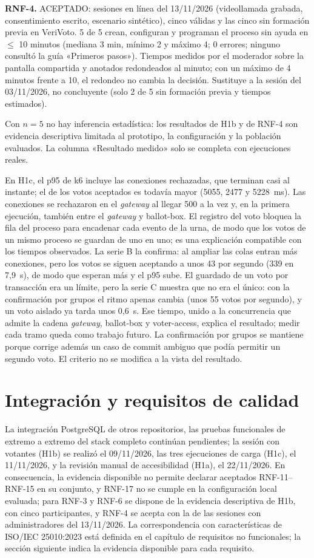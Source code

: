 \textbf{RNF-4.} ACEPTADO: sesiones en línea del 13/11/2026 (videollamada grabada, consentimiento escrito, escenario sintético), cinco válidas y las cinco sin formación previa en VeriVoto. 5 de 5 crean, configuran y programan el proceso sin ayuda en $\leq$ 10 minutos (mediana 3 min, mínimo 2 y máximo 4; 0 errores; ninguno consultó la guía «Primeros pasos»). Tiempos medidos por el moderador sobre la pantalla compartida y anotados redondeados al minuto; con un máximo de 4 minutos frente a 10, el redondeo no cambia la decisión. Sustituye a la sesión del 03/11/2026, no concluyente (solo 2 de 5 sin formación previa y tiempos estimados).

Con $n = 5$ no hay inferencia estadística: los resultados de H1b y de RNF-4
son evidencia descriptiva limitada al prototipo, la configuración y la
población evaluados. La columna «Resultado medido» solo se completa con
ejecuciones reales.

En H1c, el p95 de k6 incluye las conexiones rechazadas, que terminan casi al
instante; el de los votos aceptados es todavía mayor (5055, 2477 y 5228~ms).
Las conexiones se rechazaron en el \emph{gateway} al llegar 500 a la vez y, en
la primera ejecución, también entre el \emph{gateway} y ballot-box. El registro
del voto bloquea la fila del proceso para encadenar cada evento de la urna, de
modo que los votos de un mismo proceso se guardan de uno en uno; es una
explicación compatible con los tiempos observados. La serie B la confirma: al
ampliar las colas entran más conexiones, pero los votos se siguen aceptando a
unos 43 por segundo (339 en 7,9~s), de modo que esperan más y el p95 sube. El
guardado de un voto por transacción era un límite, pero la serie C muestra que
no era el único: con la confirmación por grupos el ritmo apenas cambia (unos 55
votos por segundo), y un voto aislado ya tarda unos 0,6~s. Ese tiempo, unido a la
concurrencia que admite la cadena \emph{gateway}, ballot-box y voter-access,
explica el resultado; medir cada tramo queda como trabajo futuro. La
confirmación por grupos se mantiene porque corrige además un caso de commit
ambiguo que podía permitir un segundo voto. El criterio no se modifica a la
vista del resultado.

\section{Integración y requisitos de calidad}
La integración PostgreSQL de otros repositorios, las pruebas funcionales de extremo a extremo del stack completo continúan pendientes; la sesión con votantes (H1b) se realizó el 09/11/2026,
las tres ejecuciones de carga (H1c), el 11/11/2026, y la revisión manual de accesibilidad (H1a), el 22/11/2026. En consecuencia, la
evidencia disponible no permite declarar aceptados
RNF-11--RNF-15 en su conjunto, y RNF-17 no se cumple en la configuración
local evaluada; para RNF-3 y RNF-6 se dispone de la evidencia
descriptiva de H1b, con cinco participantes, y RNF-4 se acepta con la de las
sesiones con administradores del 13/11/2026.
La correspondencia con características de ISO/IEC 25010:2023 está definida
en el capítulo de requisitos no funcionales; la sección siguiente indica la
evidencia disponible para cada requisito.


